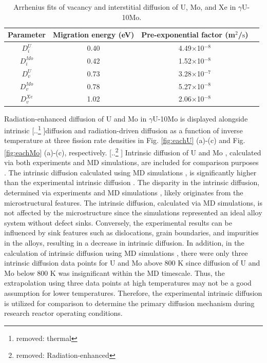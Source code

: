 \documentclass[preprint,12pt]{elsarticle}
\providecommand{\DIFadd}[1]{{\protect\color{blue} \sf #1}} %
\providecommand{\DIFdel}[1]{{\protect\color{red} [..\footnote{removed: #1} ]}} %
\providecommand{\DIFaddbegin}{} %
\providecommand{\DIFaddend}{} %
\providecommand{\DIFdelbegin}{} %
\providecommand{\DIFdelend}{} %
\newcommand{\DIFscaledelfig}{0.5}
\newlength{\DIFdelgraphicswidth} %
\newlength{\DIFdelgraphicsheight} %
\newcommand{\DIFaddincludegraphics}[2][]{{\color{blue}\fbox{\DIFOincludegraphics[#1]{#2}}}} %
\newcommand{\DIFdelincludegraphics}[2][]{%
\sbox{\DIFdelgraphicsbox}{\DIFOincludegraphics[#1]{#2}}%
\settoboxwidth{\DIFdelgraphicswidth}{\DIFdelgraphicsbox} %
\settoboxtotalheight{\DIFdelgraphicsheight}{\DIFdelgraphicsbox} %
\scalebox{\DIFscaledelfig}{%
\parbox[b]{\DIFdelgraphicswidth}{\usebox{\DIFdelgraphicsbox}\\[-\baselineskip] \rule{\DIFdelgraphicswidth}{0em}}\llap{\resizebox{\DIFdelgraphicswidth}{\DIFdelgraphicsheight}{%
\setlength{\unitlength}{\DIFdelgraphicswidth}%
\begin{picture}(1,1)%
\thicklines\linethickness{2pt} %
{\color[rgb]{1,0,0}\put(0,0){\framebox(1,1){}}}%
{\color[rgb]{1,0,0}\put(0,0){\line( 1,1){1}}}%
{\color[rgb]{1,0,0}\put(0,1){\line(1,-1){1}}}%
\end{picture}%
}\hspace*{3pt}}} %
} %
\DeclareRobustCommand{\DIFaddbegin}{\DIFOaddbegin \let\includegraphics\DIFaddincludegraphics} %
\DeclareRobustCommand{\DIFaddend}{\DIFOaddend \let\includegraphics\DIFOincludegraphics} %
\DeclareRobustCommand{\DIFdelbegin}{\DIFOdelbegin \let\includegraphics\DIFdelincludegraphics} %
\DeclareRobustCommand{\DIFdelend}{\DIFOaddend \let\includegraphics\DIFOincludegraphics} %
\begin{document}
\begin{table}[hbt!]
\captionsetup{font=normalsize} 
\caption{Arrhenius fits of vacancy and interstitial diffusion of U, Mo, and Xe in $\gamma$U-10Mo.}
\renewcommand{\arraystretch}{1.2}
\begin{center}
\begin{tabular}{cccc}
\hline
Parameter & Migration energy (eV) & Pre-exponential factor (m$^{2}$/$\mathrm{s}$)  \\ 
\hline
$D^{U}_{i}$ & 0.40 & 4.49$\times$10$^{-8}$ \\  
$D^{Mo}_{i}$& 0.42 & 1.52$\times$10$^{-8}$ \\
$D^{U}_{v}$ & 0.73  & 3.28$\times$10$^{-7}$ \\ 
$D^{Mo}_{v}$& 0.78 & 5.27$\times$10$^{-8}$ \\
$D^{Xe}_{v}$& 1.02 & 2.06$\times$10$^{-8}$ \\
\hline
\end{tabular}
\end{center}
\label{tab:diff1} 
\end{table} 

Radiation-enhanced diffusion of U and Mo in $\gamma$U-10Mo is displayed alongside intrinsic \DIFdelbegin \DIFdel{thermal }\DIFdelend diffusion and radiation-driven diffusion as a function of inverse temperature at three fission rate densities in Fig. \ref{fig:eachU} (a)-(c) and Fig. \ref{fig:eachMo} (a)-(c), respectively. \DIFdelbegin \DIFdel{Radiation-enhanced }\DIFdelend \DIFaddbegin \DIFadd{Intrinsic }\DIFaddend diffusion of U and Mo\DIFaddbegin \DIFadd{, calculated via both experiments and MD simulations, are included for comparison purposes \cite{huang2013, park2021atomistic}. The intrinsic diffusion calculated using MD simulations \cite{park2021atomistic}, is significantly higher than the experimental intrinsic diffusion \cite{huang2013}. The disparity in the intrinsic diffusion, determined via experiments \cite{huang2013} and MD simulations \cite{park2021atomistic}, likely originates from the microstructural features. The intrinsic diffusion, calculated via MD simulations, is not affected by the microstructure since the simulations represented an ideal alloy system without defect sinks. Conversely, the experimental results can be influenced by sink features such as dislocations, grain boundaries, and impurities in the alloys, resulting in a decrease in intrinsic diffusion. In addition, in the calculation of intrinsic diffusion using MD simulations \cite{park2021atomistic}, there were only three intrinsic diffusion data points for U and Mo above 800 K since diffusion of U and Mo below 800 K was insignificant within the MD timescale. Thus, the extrapolation using three data points at high temperatures may not be a good assumption for lower temperatures. Therefore, the experimental intrinsic diffusion is utilized for comparison to determine the primary diffusion mechanism during research reactor operating conditions.
}\\
\end{document}

